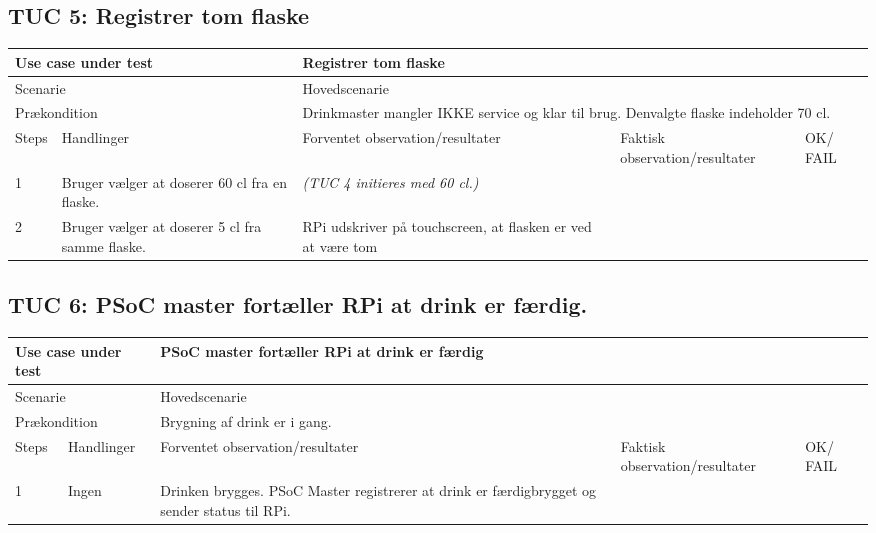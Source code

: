\subsection{TUC 5: Registrer tom flaske}

\begin{table}[H]
\begin{tabular}{|p{1cm}|p{4cm}|p{4cm}|p{4cm}|p{1cm}|}
\hline
\multicolumn{2}{|p{5cm}|}{Use case under test} & \multicolumn{3}{p{9cm}|}{Registrer tom flaske}                                       \\ \hline
\multicolumn{2}{|p{5cm}|}{Scenarie}            & \multicolumn{3}{p{9cm}|}{Hovedscenarie}                                          \\ \hline
\multicolumn{2}{|p{5cm}|}{Prækondition}        & \multicolumn{3}{p{9cm}|}{Drinkmaster mangler IKKE service og klar til brug. Denvalgte flaske indeholder 70 cl.}                                 \\ \hline
Steps               & Handlinger          & Forventet observation/resultater & Faktisk observation/resultater & OK/ FAIL \\ \hline
1    & Bruger vælger at doserer 60 cl fra en flaske.  &  \textit{(TUC 4 initieres med 60 cl.)} &   &         \\ \hline
2   & Bruger vælger at doserer 5 cl fra samme flaske. & RPi udskriver på touchscreen, at flasken er ved at være tom &    &   \\ \hline

\end{tabular}
\end{table}

\subsection{TUC 6: PSoC master fortæller RPi at drink er færdig.}

\begin{table}[H]
\begin{tabular}{|p{1cm}|p{4cm}|p{4cm}|p{4cm}|p{1cm}|}
\hline
\multicolumn{2}{|p{5cm}|}{Use case under test} & \multicolumn{3}{p{9cm}|}{PSoC master fortæller RPi at drink er færdig}                                       \\ \hline
\multicolumn{2}{|p{5cm}|}{Scenarie}            & \multicolumn{3}{p{9cm}|}{Hovedscenarie}                                          \\ \hline
\multicolumn{2}{|p{5cm}|}{Prækondition}        & \multicolumn{3}{p{9cm}|}{Brygning af drink er i gang.}                                 \\ \hline
Steps               & Handlinger          & Forventet observation/resultater & Faktisk observation/resultater & OK/ FAIL \\ \hline
1    & Ingen  &   Drinken brygges. PSoC Master registrerer at drink er færdigbrygget og sender status til RPi. &   &         \\ \hline

\end{tabular}
\end{table}